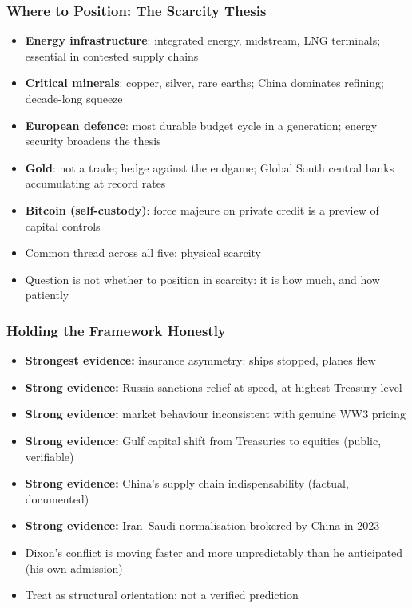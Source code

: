 \begin{frame}[fragile]\frametitle{Where to Position: The Scarcity Thesis}
  \begin{itemize}
    \item \textbf{Energy infrastructure}: integrated energy, midstream, LNG terminals; essential in contested supply chains
    \item \textbf{Critical minerals}: copper, silver, rare earths; China dominates refining; decade-long squeeze
    \item \textbf{European defence}: most durable budget cycle in a generation; energy security broadens the thesis
    \item \textbf{Gold}: not a trade; hedge against the endgame; Global South central banks accumulating at record rates
    \item \textbf{Bitcoin (self-custody)}: force majeure on private credit is a preview of capital controls
    \item Common thread across all five: \alert{physical scarcity}
    \item Question is not whether to position in scarcity: it is how much, and how patiently
  \end{itemize}
\end{frame}

\begin{frame}[fragile]\frametitle{Holding the Framework Honestly}
  \begin{itemize}
    \item \textbf{Strongest evidence:} insurance asymmetry: ships stopped, planes flew
    \item \textbf{Strong evidence:} Russia sanctions relief at speed, at highest Treasury level
    \item \textbf{Strong evidence:} market behaviour inconsistent with genuine WW3 pricing
    \item \textbf{Strong evidence:} Gulf capital shift from Treasuries to equities (public, verifiable)
    \item \textbf{Strong evidence:} China's supply chain indispensability (factual, documented)
    \item \textbf{Strong evidence:} Iran--Saudi normalisation brokered by China in 2023
    \item Dixon's conflict is moving faster and more unpredictably than he anticipated (his own admission)
    \item Treat as structural orientation: not a verified prediction
  \end{itemize}
\end{frame}

